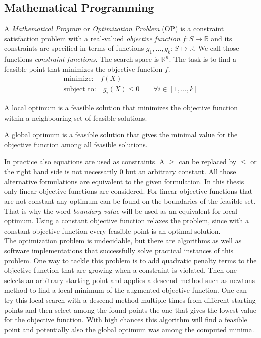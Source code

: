 \subsection{Mathematical Programming}
A \emph{Mathematical Program} or \emph{Optimization Problem} (OP) is a constraint satisfaction problem with a real-valued \emph{objective function} $f:S\mapsto \mathbb{R}$ and its constraints are specified in terms of functions $g_1,\dots,g_k:S\mapsto\mathbb{R}$. We call those functions \emph{constraint functions}. The search space is $\mathbb{R}^n$. The task is to find a feasible point that minimizes the objective function $f$.
\begin{eqnarray}
\text{minimize:} \quad f(X)\\
\text{subject to:} \quad g_i(X)\leq 0 \qquad \forall i\in\left[1,\dots ,k\right] 
\end{eqnarray}
\begin{definition}
A local optimum is a feasible solution that minimizes the objective function within a neighbouring set of feasible solutions.
\end{definition}
\begin{definition}
A global optimum is a feasible solution that gives the minimal value for the objective function among all feasible solutions.
\end{definition}
In practice also equations are used as constraints. A $\geq$ can be replaced by $\leq$ or the right hand side is not necessarily $0$ but an arbitrary constant. All those alternative formulations are equivalent to the given formulation.
In this thesis only linear objective functions are considered. For linear objective functions that are not constant any optimum can be found on the boundaries of the feasible set. That is why the word \emph{boundary value} will be used as an equivalent for local optimum. Using a constant objective function relaxes the problem, since with a constant objective function every feasible point is an optimal solution.\\
The optimization problem is undecidable, but there are algorithms as well as software implementations that successfully solve practical instances of this problem. One way to tackle this problem is to add quadratic penalty terms to the objective function that are growing when a constraint is violated. Then one selects an arbitrary starting point and applies a descend method such as newtons method to find a local minimum of the augmented objective function. One can try this local search with a descend method multiple times from different starting points and then select among the found points the one that gives the lowest value for the objective function. With high chances this algorithm will find a feasible point and potentially also the global optimum was among the computed minima.
